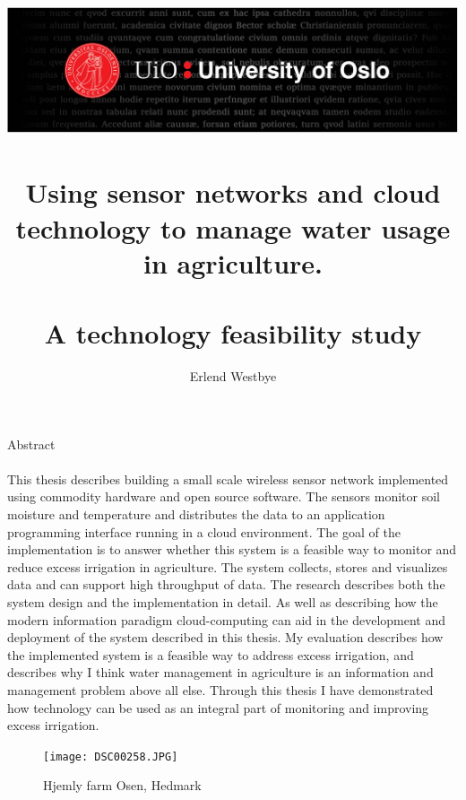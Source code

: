\documentclass[]{uiophd}
\begin{document}
\title{\includegraphics[scale=0.5]{toppfelt-english.jpg}\\\\
Using sensor networks and cloud technology to manage water usage in agriculture.
\\\\
\large A technology feasibility study}
\author{Erlend Westbye}


\frontmatter
\maketitle
Abstract
\\\\
This thesis describes building a small scale wireless sensor network implemented using commodity hardware and open source software. The sensors monitor soil moisture and temperature and distributes the data to an application programming interface running in a cloud environment. The goal of the implementation is to answer whether this system is a feasible way to monitor and reduce excess irrigation in agriculture. The system collects, stores and visualizes data and can support high throughput of data. The research describes both the system design and the implementation in detail. As well as describing how the modern information paradigm cloud-computing can aid in the development and deployment of the system described in this thesis. My evaluation describes how the implemented system is a feasible way to address excess irrigation, and describes why I think water management in agriculture is an information and management problem above all else. Through this thesis I have demonstrated how technology can be used as an integral part of monitoring and improving excess irrigation.

\begin{figure}[h]
\caption{Hjemly farm Osen, Hedmark}
\centering
\texttt{[image: DSC00258.JPG]}
\end{figure}
\tableofcontents
\linespread{1.3}

\mainmatter
\end{document}
